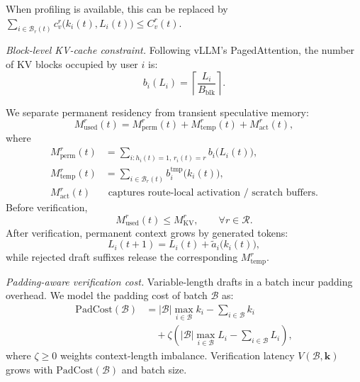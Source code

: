 \documentclass[journal]{IEEEtran}
\begin{document}
When profiling is available, this can be replaced by 
$\sum_{i \in \mathcal{B}_r(t)}
c_v^r\bigl(k_i(t),L_i(t)\bigr) \leq C_v^r(t)$.

\textit{Block-level KV-cache constraint.}
Following vLLM's PagedAttention, the number of KV blocks 
occupied by user $i$ is:
\begin{equation}
    \label{eq:block-count}
    b_i(L_i) = \left\lceil \frac{L_i}{B_{\text{blk}}} 
    \right\rceil.
\end{equation}

We separate permanent residency from transient 
speculative memory:
\begin{equation}
    \label{eq:kv-decomp}
    M_{\text{used}}^r(t) = M_{\text{perm}}^r(t) + 
    M_{\text{temp}}^r(t) + M_{\text{act}}^r(t),
\end{equation}
where
\begin{align}
    M_{\text{perm}}^r(t) &= 
    \sum_{i: h_i(t)=1,\,r_i(t)=r} b_i\bigl(L_i(t)\bigr), \\
    M_{\text{temp}}^r(t) &= 
    \sum_{i \in \mathcal{B}_r(t)} b_i^{\text{tmp}}\bigl(k_i(t)\bigr), \\
    M_{\text{act}}^r(t) &\text{ captures route-local activation / scratch buffers.}
\end{align}
Before verification,
\begin{equation}
    \label{eq:memory-constraint}
    M_{\text{used}}^r(t) \leq M_{\text{KV}}^r,
    \qquad \forall r\in\mathcal{R}.
\end{equation}
After verification, permanent context grows by generated 
tokens:
\begin{equation}
    \label{eq:context-update}
    L_i(t{+}1) = L_i(t) + \tilde{a}_i\bigl(k_i(t)\bigr),
\end{equation}
while rejected draft suffixes release the corresponding
$M_{\text{temp}}^r$.

\textit{Padding-aware verification cost.}
Variable-length drafts in a batch incur padding overhead. 
We model the padding cost of batch $\mathcal{B}$ as:
\begin{equation}
    \label{eq:pad-cost}
    \begin{aligned}
    \text{PadCost}(\mathcal{B}) 
    &= |\mathcal{B}| \max_{i \in \mathcal{B}} k_i 
    - \sum_{i \in \mathcal{B}} k_i \\
    &\quad + \zeta \left( 
    |\mathcal{B}| \max_{i \in \mathcal{B}} L_i 
    - \sum_{i \in \mathcal{B}} L_i \right),
    \end{aligned}
\end{equation}
where $\zeta \geq 0$ weights context-length imbalance. 
Verification latency $V(\mathcal{B}, \mathbf{k})$ grows 
with $\text{PadCost}(\mathcal{B})$ and batch size.
\end{document}
